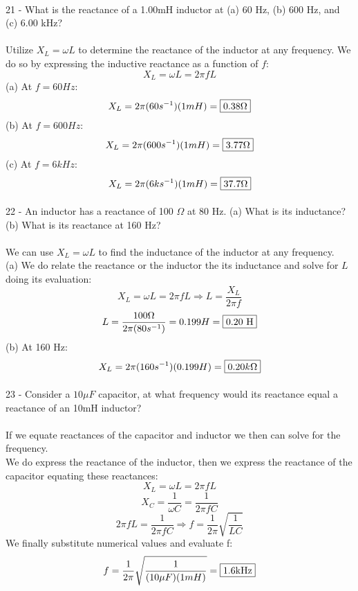 \documentclass{report}
\begin{document}
\paragraph{}
21 - What is the reactance of a 1.00mH inductor at (a) 60 Hz, (b) 600 Hz, and (c) 6.00 kHz?\\
\\
Utilize $X_L = \omega L$ to determine the reactance of the inductor at any frequency. We do so by expressing the inductive reactance as a function of $f:$
$$X_L = \omega L = 2\pi fL$$
(a) At $f = 60Hz:$
$$X_L = 2\pi (60s^{-1})(1mH) = \fbox{$0.38\Omega$}$$
(b) At $f = 600Hz:$
$$X_L = 2\pi (600s^{-1})(1mH) = \fbox{$3.77\Omega$}$$
(c) At $f = 6kHz:$
$$X_L = 2\pi (6ks^{-1})(1mH) = \fbox{$37.7\Omega$}$$

\paragraph{}
22 - An inductor has a reactance of 100 $\Omega$ at 80 Hz. (a) What is its inductance? (b) What is its reactance at 160 Hz?\\
\\
We can use $X_L = \omega L$ to find the inductance of the inductor at any frequency.\\
(a) We do relate the reactance or the inductor the its inductance and solve for $L$ doing its evaluation:
$$X_L = \omega L = 2\pi fL \Rightarrow L = \frac{X_L}{2\pi f}$$
$$L = \frac{100 \Omega}{2\pi (80s^{-1})} = 0.199H = \fbox{0.20 H}$$
(b) At 160 Hz:
$$X_L = 2\pi (160s^{-1})(0.199H) = \fbox{$0.20k\Omega$}$$

\paragraph{}
23 - Consider a $10\mu F$ capacitor, at what frequency would its reactance equal a reactance of an 10mH inductor?\\
\\
If we equate reactances of the capacitor and inductor we then can solve for the frequency.\\
We do express the reactance of the inductor, then we express the reactance of the capacitor equating these reactances:
$$X_L = \omega L = 2\pi fL$$
$$X_C = \frac{1}{\omega C} = \frac{1}{2\pi fC}$$
$$2\pi fL = \frac{1}{2\pi fC} \Rightarrow f = \frac{1}{2\pi} \sqrt{\frac{1}{LC}}$$
We finally substitute numerical values and evaluate f:
$$f = \frac{1}{2\pi}\sqrt{\frac{1}{(10\mu F)(1mH)}} = \fbox{1.6kHz}$$
\end{document}
